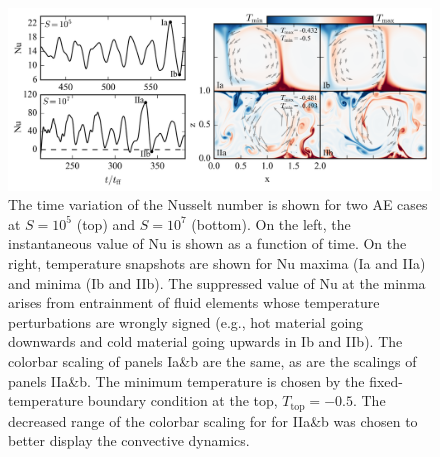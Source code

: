 \begin{figure}[ht!]
\includegraphics[width=\textwidth]{./figs/oscillating_plumes.pdf}
\caption[Dynamical description explaining instantaneously negative Nusselt number values]
{
	The time variation of the Nusselt number is shown for two AE cases at $S = 10^5$ (top) and $S = 10^7$ (bottom). 
	On the left, the instantaneous value of Nu is shown as a function of time. 
	On the right, temperature snapshots are shown for Nu maxima (Ia and IIa) and minima (Ib and IIb). 
	The suppressed value of Nu at the minma arises from entrainment of fluid elements whose temperature perturbations are wrongly signed (e.g., hot material going downwards and cold material going upwards in Ib and IIb). 
	The colorbar scaling of panels Ia\&b are the same, as are the scalings of panels IIa\&b. 
	The minimum temperature is chosen by the fixed-temperature boundary condition at the top, $T_{\text{top}} = -0.5$. 
	The decreased range of the colorbar scaling for for IIa\&b was chosen to better display the convective dynamics. 
	\label{fig:oscillating_plumes} 
}
\end{figure}
